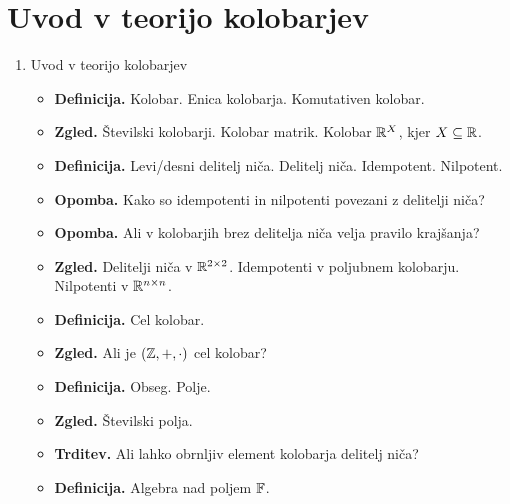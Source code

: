 \section{Uvod v teorijo kolobarjev}

\begin{enumerate}
    \item Uvod v teorijo kolobarjev
    \begin{itemize}
        \item \textbf{Definicija.} Kolobar. Enica kolobarja. Komutativen kolobar.
        \item \textbf{Zgled.} Številski kolobarji. Kolobar matrik. Kolobar \(\mathbb{R}^X\), kjer \(X \subseteq \mathbb{R}\).
        \item \textbf{Definicija.} Levi/desni delitelj niča. Delitelj niča. Idempotent. Nilpotent.
        \item \textbf{Opomba.} Kako so idempotenti in nilpotenti povezani z delitelji niča?
        \item \textbf{Opomba.} Ali v kolobarjih brez delitelja niča velja pravilo krajšanja?
        \item \textbf{Zgled.} Delitelji niča v $\mathbb{R}^{2 \times 2}$. Idempotenti v poljubnem kolobarju. Nilpotenti v \(\mathbb{R}^{n \times n}\).
        \item \textbf{Definicija.} Cel kolobar.
        \item \textbf{Zgled.} Ali je \((\mathbb{Z}, +, \cdot)\) cel kolobar?
        \item \textbf{Definicija.} Obseg. Polje.
        \item \textbf{Zgled.} Številski polja.
        \item \textbf{Trditev.} Ali lahko obrnljiv element kolobarja delitelj niča?
        \item \textbf{Definicija.} Algebra nad poljem \(\mathbb{F}\).
    \end{itemize}


\end{enumerate}
